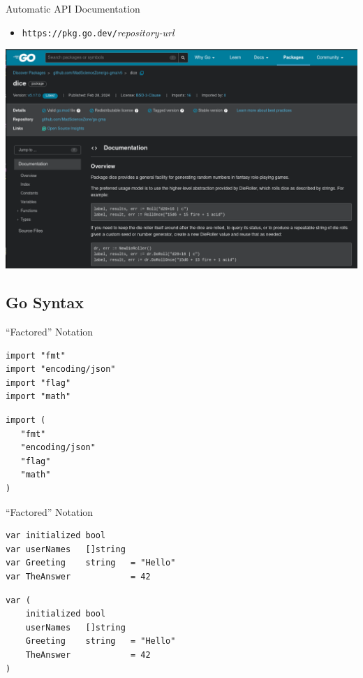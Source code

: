 \documentclass[pdf]{beamer}
\newcommand\z[1]{\texttt{#1}}
\begin{document}
\begin{frame}{Automatic API Documentation}
\begin{itemize}
\item\z{https://pkg.go.dev/}\emph{repository-url}
\end{itemize}
    \begin{center}
        \includegraphics[width=\textwidth]{docsite}
    \end{center}
\end{frame}

\subsection{Go Syntax}
\begin{frame}[fragile]{``Factored'' Notation}
\begin{lstlisting}
import "fmt"
import "encoding/json"
import "flag"
import "math"
\end{lstlisting}
\pause
\begin{lstlisting}
import (
   "fmt"
   "encoding/json"
   "flag"
   "math"
)
\end{lstlisting}
\end{frame}

\begin{frame}[fragile]{``Factored'' Notation}
\begin{lstlisting}
var initialized bool
var userNames   []string
var Greeting    string   = "Hello"
var TheAnswer            = 42
\end{lstlisting}
\begin{lstlisting}
var (
    initialized bool
    userNames   []string
    Greeting    string   = "Hello"
    TheAnswer            = 42
)
\end{lstlisting}
\end{frame}
\end{document}

